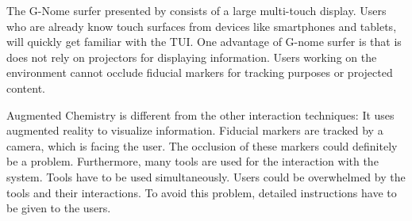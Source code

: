 The G-Nome surfer presented by \cite{shaer10} consists of a large multi-touch display. Users who are already know touch surfaces from devices like smartphones and tablets, will quickly get familiar with the TUI. One advantage of G-nome surfer is that is does not rely on projectors for displaying information. Users working on the environment cannot occlude fiducial markers for tracking purposes or projected content. 

Augmented Chemistry \cite{fjeld02} is different from the other interaction techniques: It uses augmented reality to visualize information. Fiducial markers are tracked by a camera, which is facing the user. The occlusion of these markers could definitely be a problem. Furthermore, many tools are used for the interaction with the system. Tools have to be used simultaneously. Users could be overwhelmed by the tools and their interactions. To avoid this problem, detailed instructions have to be given to the users. 


